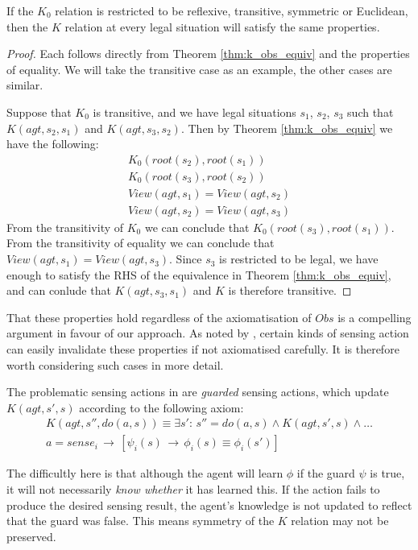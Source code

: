 \begin{thm}
If the $K_{0}$ relation is restricted to be reflexive, transitive,
symmetric or Euclidean, then the $K$ relation at every legal situation
will satisfy the same properties. 
\end{thm}
\begin{proof}
Each follows directly from Theorem \ref{thm:k_obs_equiv} and the
properties of equality. We will take the transitive case as an example,
the other cases are similar.

Suppose that $K_{0}$ is transitive, and we have legal situations
$s_{1}$, $s_{2}$, $s_{3}$ such that $K(agt,s_{2},s_{1})$ and $K(agt,s_{3},s_{2})$.
Then by Theorem \ref{thm:k_obs_equiv} we have the following:\begin{gather*}
K_{0}(root(s_{2}),root(s_{1}))\\
K_{0}(root(s_{3}),root(s_{2}))\\
View(agt,s_{1})=View(agt,s_{2})\\
View(agt,s_{2})=View(agt,s_{3})\end{gather*}
 From the transitivity of $K_{0}$ we can conclude that $K_{0}(root(s_{3}),root(s_{1}))$.
From the transitivity of equality we can conclude that $View(agt,s_{1})=View(agt,s_{3})$.
Since $s_{3}$ is restricted to be legal, we have enough to satisfy
the RHS of the equivalence in Theorem \ref{thm:k_obs_equiv}, and
can conlude that $K(agt,s_{3},s_{1})$ and $K$ is therefore transitive. 
\end{proof}
That these properties hold regardless of the axiomatisation of $Obs$
is a compelling argument in favour of our approach. As noted by \citet{Petrick06thesis},
certain kinds of sensing action can easily invalidate these properties
if not axiomatised carefully. It is therefore worth considering such
cases in more detail.

The problematic sensing actions in \citep{Petrick06thesis} are \emph{guarded}
sensing actions, which update $K(agt,s',s)$ according to the following
axiom: \begin{multline*}
K(agt,s'',do(a,s))\equiv\exists s':\, s''=do(a,s)\wedge K(agt,s',s)\wedge\dots\\
a=sense_{i}\,\rightarrow\,\left[\psi_{i}(s)\,\rightarrow\,\phi_{i}(s)\equiv\phi_{i}(s')\right]\end{multline*}


The difficultly here is that although the agent will learn $\phi$
if the guard $\psi$ is true, it will not necessarily \emph{know whether}
it has learned this. If the action fails to produce the desired sensing
result, the agent's knowledge is not updated to reflect that the guard
was false. This means symmetry of the $K$ relation may not be preserved.

